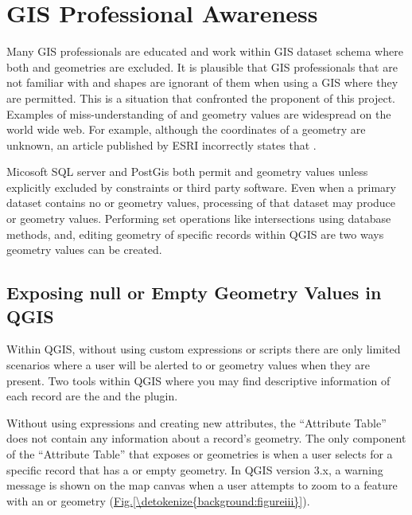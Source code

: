 \documentclass[a4paper,11pt,english]{sphinxmanual}
\begin{document}
\section{GIS Professional Awareness}
\label{\detokenize{background:gis-professional-awareness}}
Many GIS professionals are educated and work within GIS dataset schema where both  and  geometries are excluded.  It is plausible that GIS professionals that are not familiar with  and  shapes are ignorant of them when using a GIS where they are permitted.  This is a situation that confronted the proponent of this project.  Examples of miss-understanding of  and  geometry values are widespread on the world wide web.  For example, although the coordinates of a  geometry are unknown, an article published by ESRI incorrectly states that  .

Micosoft SQL server and PostGis both permit  and  geometry values unless explicitly excluded by constraints or third party software.  Even when a primary dataset contains no  or  geometry values, processing of that dataset may produce  or  geometry values.  Performing set operations like intersections using database methods, and, editing geometry of specific records within QGIS are two ways  geometry values can be created.


\subsection{Exposing null or Empty Geometry Values in QGIS}
\label{\detokenize{background:exposing-null-or-empty-geometry-values-in-qgis}}
Within QGIS, without using custom expressions or scripts there are only limited scenarios where a user will be alerted to  or  geometry values when they are present.  Two tools within QGIS where you may find descriptive information of each record are the  and the  plugin.

Without using expressions and creating new attributes, the “Attribute Table” does not contain any information about a record’s geometry.  The only component of the “Attribute Table” that exposes  or  geometries is when a user selects  for a specific record that has a  or empty geometry.  In QGIS version 3.x, a warning message is shown on the map canvas when a user attempts to zoom to a feature with an  or  geometry (\hyperref[\detokenize{background:figureiii}]{Fig.\@ \ref{\detokenize{background:figureiii}}}).
\end{document}
